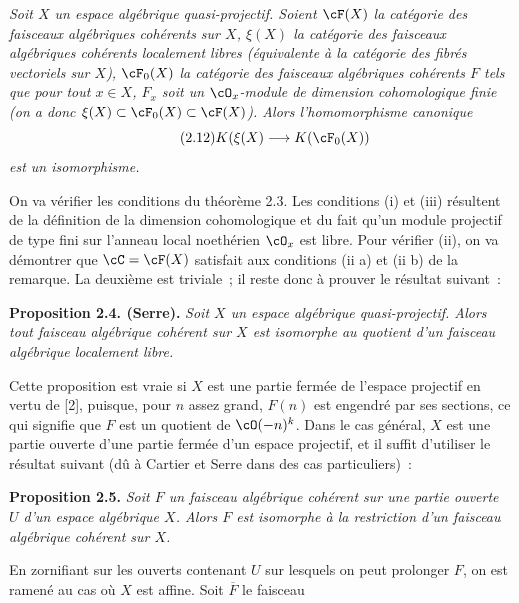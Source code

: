 \emph{Soit $X$ un espace algébrique quasi-projectif. Soient $\cF(X)$ la catégorie des faisceaux algébriques cohérents sur $X$, $\xi(X)$ la catégorie des faisceaux algébriques cohérents localement libres (équivalente à la catégorie des fibrés vectoriels sur $X$), $\cF_0(X)$ la catégorie des faisceaux algébriques cohérents $F$ tels que pour tout $x\in X$, $F_x$ soit un $\cO_x$-module de dimension cohomologique finie (on a donc $\xi(X)\subset\cF_0(X)\subset\cF(X)$). Alors l'homomorphisme canonique}
\begin{equation}\tag{2.12}
 K(\xi(X)\longrightarrow K(\cF_0(X))
\end{equation}
\emph{est un isomorphisme.}

On va vérifier les conditions du théorème 2.3. Les conditions (i) et (iii) résultent de la définition de la dimension cohomologique et du fait qu'un module projectif de type fini sur l'anneau local noethérien $\cO_x$ est libre. Pour vérifier (ii), on va démontrer que $\cC=\cF(X)$ satisfait aux conditions (ii a) et (ii b) de la remarque. La deuxième est triviale~; il reste donc à prouver le résultat suivant~:

\textbf{Proposition 2.4. (Serre).} \emph{Soit $X$ un espace algébrique quasi-projectif. Alors tout faisceau algébrique cohérent sur $X$ est isomorphe au quotient d'un faisceau algébrique localement libre.}

Cette proposition est vraie si $X$ est une partie fermée de l'espace projectif en vertu de [2], puisque, pour $n$ assez grand, $F(n)$ est engendré par ses sections, ce qui signifie que $F$ est un quotient de $\cO(-n)^k$. Dans le cas général, $X$ est une partie ouverte d'une partie fermée d'un espace projectif, et il suffit d'utiliser le résultat suivant (dû à Cartier et Serre dans des cas particuliers)~:

\textbf{Proposition 2.5.} \emph{Soit $F$ un faisceau algébrique cohérent sur une partie ouverte $U$ d'un espace algébrique $X$. Alors $F$ est isomorphe à la restriction d'un faisceau algébrique cohérent sur $X$.}

En zornifiant sur les ouverts contenant $U$ sur lesquels on peut prolonger $F$, on est ramené au cas où $X$ est affine. Soit $\overline F$ le faisceau
